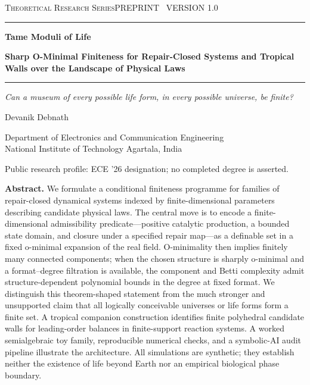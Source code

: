 \documentclass[11pt,a4paper]{article}
\theoremstyle{definition}
\theoremstyle{remark}
\begin{document}
\begin{titlepage}
\color{ink}
\vspace*{0.7cm}
{\large\textsc{Theoretical Research Series}}\hfill{\small PREPRINT \textbullet\ VERSION 1.0}
\vspace{1.4cm}
{\color{accent}\rule{\textwidth}{1.2pt}}
\vspace{0.55cm}
{\fontsize{27}{31}\selectfont\bfseries Tame Moduli of Life}\par
\vspace{0.28cm}
{\fontsize{16}{21}\selectfont\bfseries Sharp O-Minimal Finiteness for Repair-Closed Systems and Tropical Walls over the Landscape of Physical Laws}\par
\vspace{0.55cm}
{\color{accent}\rule{0.42\textwidth}{1.2pt}}
\vspace{0.75cm}
{\large\itshape Can a museum of every possible life form, in every possible universe, be finite?}\par
\vspace{1.25cm}
{\Large Devanik Debnath}\par
{\normalsize Department of Electronics and Communication Engineering\\National Institute of Technology Agartala, India}\par
{\small Public research profile: ECE '26 designation; no completed degree is asserted.}\par
\vspace{0.7cm}
\begin{minipage}{0.92\textwidth}
\small
\textbf{Abstract.} We formulate a conditional finiteness programme for families of repair-closed dynamical systems indexed by finite-dimensional parameters describing candidate physical laws. The central move is to encode a finite-dimensional admissibility predicate---positive catalytic production, a bounded state domain, and closure under a specified repair map---as a definable set in a fixed o-minimal expansion of the real field. O-minimality then implies finitely many connected components; when the chosen structure is sharply o-minimal and a format--degree filtration is available, the component and Betti complexity admit structure-dependent polynomial bounds in the degree at fixed format. We distinguish this theorem-shaped statement from the much stronger and unsupported claim that all logically conceivable universes or life forms form a finite set. A tropical companion construction identifies finite polyhedral candidate walls for leading-order balances in finite-support reaction systems. A worked semialgebraic toy family, reproducible numerical checks, and a symbolic-AI audit pipeline illustrate the architecture. All simulations are synthetic; they establish neither the existence of life beyond Earth nor an empirical biological phase boundary.

\end{minipage}
\end{titlepage}
\end{document}

